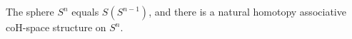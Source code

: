 The sphere $S^n$ equals $S(S^{n-1})$, and there is a natural homotopy associative coH-space structure on $S^n$.
